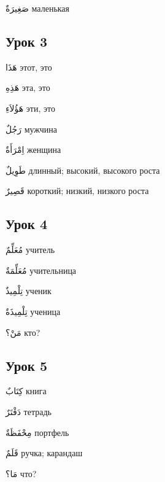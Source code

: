 \documentclass[a5paper]{article}
\newcommand\textstyleDropCaps[1]{#1}
\newcommand\textstyleCaptioncharacters[1]{#1}
\begin{document}
\textstyleCaptioncharacters{صَغِيرَةٌ }\textstyleDropCaps{маленькая‎}

\subsection[Урок 3‎]{\textstyleDropCaps{Урок 3‎}}
\textstyleCaptioncharacters{هَذَا }\textstyleDropCaps{этот, это‎}

\textstyleCaptioncharacters{هَذِهِ }\textstyleDropCaps{эта, это‎}

\textstyleCaptioncharacters{هَؤُلاَءِ }\textstyleDropCaps{эти, это‎}

\textstyleCaptioncharacters{رَجُلٌ }\textstyleDropCaps{мужчина‎}

\textstyleCaptioncharacters{اِمْرَأَةٌ }\textstyleDropCaps{женщина‎}

\textstyleCaptioncharacters{طَوِيلٌ }\textstyleDropCaps{длинный; высо­кий, высокого роста‎}

\textstyleCaptioncharacters{قَصِيرٌ }\textstyleDropCaps{короткий; низкий, низкого роста‎}

\subsection[Урок 4‎]{\textstyleDropCaps{Урок 4‎}}
\textstyleCaptioncharacters{مُعَلِّمٌ }\textstyleDropCaps{учитель‎}

\textstyleCaptioncharacters{مُعَلِّمَةٌ }\textstyleDropCaps{учительница‎}

\textstyleCaptioncharacters{تِلْمِيذٌ }\textstyleDropCaps{ученик‎}

\textstyleCaptioncharacters{تِلْمِيذَةٌ }\textstyleDropCaps{ученица‎}

\textstyleCaptioncharacters{مَنْ؟ }\textstyleDropCaps{кто?‎}

\subsection[Урок 5‎]{\textstyleDropCaps{Урок 5‎}}
\textstyleCaptioncharacters{كِتَابٌ }\textstyleDropCaps{книга‎}

\textstyleCaptioncharacters{دَفْتَرٌ }\textstyleDropCaps{тетрадь‎}

\textstyleCaptioncharacters{مِحْفَظَةٌ }\textstyleDropCaps{портфель‎}

\textstyleCaptioncharacters{قَلَمٌ }\textstyleDropCaps{ручка; карандаш‎}

\textstyleCaptioncharacters{مَا؟ }\textstyleDropCaps{что?‎}
\end{document}
